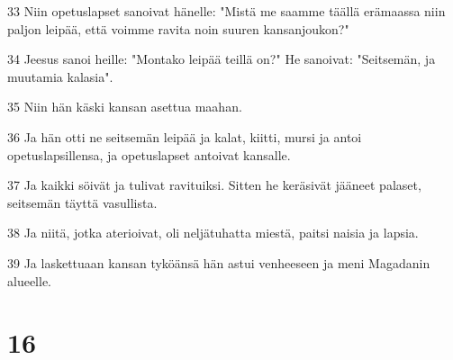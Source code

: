 \par 33 Niin opetuslapset sanoivat hänelle: "Mistä me saamme täällä erämaassa niin paljon leipää, että voimme ravita noin suuren kansanjoukon?"
\par 34 Jeesus sanoi heille: "Montako leipää teillä on?" He sanoivat: "Seitsemän, ja muutamia kalasia".
\par 35 Niin hän käski kansan asettua maahan.
\par 36 Ja hän otti ne seitsemän leipää ja kalat, kiitti, mursi ja antoi opetuslapsillensa, ja opetuslapset antoivat kansalle.
\par 37 Ja kaikki söivät ja tulivat ravituiksi. Sitten he keräsivät jääneet palaset, seitsemän täyttä vasullista.
\par 38 Ja niitä, jotka aterioivat, oli neljätuhatta miestä, paitsi naisia ja lapsia.
\par 39 Ja laskettuaan kansan tyköänsä hän astui venheeseen ja meni Magadanin alueelle.

\chapter{16}


